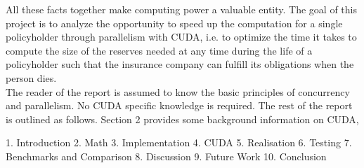 All these facts together make computing power a valuable entity. The goal of this project is to analyze the opportunity to speed up the computation for a single policyholder through parallelism with CUDA, i.e. to optimize the time it takes to compute the size of the reserves needed at any time during the life of a policyholder such that the insurance company can fulfill its obligations when the person dies.\\

The reader of the report is assumed to know the basic principles of concurrency and parallelism. No CUDA specific knowledge is required. The rest of the report is outlined as follows. Section 2 provides some background information on CUDA, 







1. Introduction
2. Math
3. Implementation
4. CUDA
5. Realisation
6. Testing
7. Benchmarks and Comparison
8. Discussion
9. Future Work
10. Conclusion